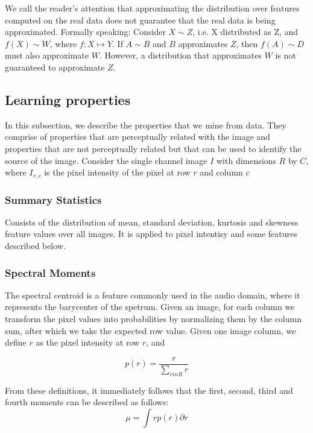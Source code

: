 We call the reader's attention that approximating the distribution over features
computed on the real data does not guarantee that the real data is being
approximated. Formally speaking:
Consider $X \sim Z$, i.e. X distributed as Z, and $f(X) \sim W$, where $f: X
\mapsto Y$.
If $A \sim B$ and $B$ approximates $Z$, then $f(A) \sim D$ must also approximate $W$.
However, a distribution that approximates $W$ is not guaranteed to approximate
$Z$.

\subsection{Learning properties}
In this subsection, we describe the properties that we mine from data. They
comprise of properties that are perceptually related with the image and
properties that are not perceptually related but that can be used to identify
the source of the image. Consider the single channel image $I$ with dimensions 
$R$ by $C$, where $I_{r, c}$ is the pixel intensity of the pixel at row $r$ and column $c$

\subsubsection{Summary Statistics}
Consists of the distribution of mean, standard
deviation, kurtosis and skewness feature values over all images. It is applied
to pixel intentisy and some features described below.

\subsubsection{Spectral Moments}
The spectral centroid is a feature commonly used in the audio domain, where it
represents the barycenter of the spetrum. Given an image, for each column we transform the
pixel values into probabilities by normalizing them by the column sum, after which we
take the expected row value. Given one image column, we define $r$ as the pixel
intensity at row $r$, and 

\begin{equation}
    p(r) = \frac{r}{\sum_{r in R}r}
\end{equation}

From these definitions, it immediately follows that the first, second, third and fourth moments
can be described as follows: 
\begin{equation}
    \mu = \int rp(r) \partial r
\end{equation}

